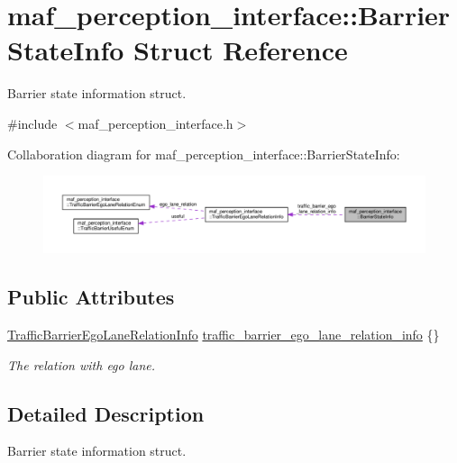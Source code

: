 \hypertarget{structmaf__perception__interface_1_1BarrierStateInfo}{}\section{maf\+\_\+perception\+\_\+interface\+:\+:Barrier\+State\+Info Struct Reference}
\label{structmaf__perception__interface_1_1BarrierStateInfo}


Barrier state information struct.  




{\ttfamily \#include $<$maf\+\_\+perception\+\_\+interface.\+h$>$}



Collaboration diagram for maf\+\_\+perception\+\_\+interface\+:\+:Barrier\+State\+Info\+:\nopagebreak
\begin{figure}[H]
\begin{center}
\leavevmode
\includegraphics[width=350pt]{structmaf__perception__interface_1_1BarrierStateInfo__coll__graph}
\end{center}
\end{figure}
\subsection*{Public Attributes}
\begin{DoxyCompactItemize}
\item 
\hyperlink{structmaf__perception__interface_1_1TrafficBarrierEgoLaneRelationInfo}{Traffic\+Barrier\+Ego\+Lane\+Relation\+Info} \hyperlink{structmaf__perception__interface_1_1BarrierStateInfo_a47c852d60d9d8c30488aac69df95828b}{traffic\+\_\+barrier\+\_\+ego\+\_\+lane\+\_\+relation\+\_\+info} \{\}
\begin{DoxyCompactList}\small\item\em The relation with ego lane. \end{DoxyCompactList}\end{DoxyCompactItemize}


\subsection{Detailed Description}
Barrier state information struct. 

